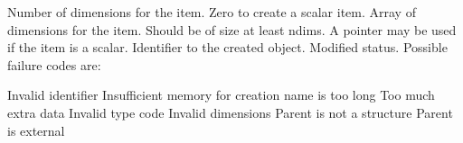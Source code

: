 \begin{manroutinedescription}
\begin{mantwocolumntable}
\end{mantwocolumntable}
\begin{manparametertable}
  Number of dimensions for the %
item. Zero
                            to create a scalar item.
 Array of dimensions for %
the item. Should be of
                            size at least ndims. A {} pointer may %
be used
                            if the item is a scalar.
 Identifier to the created %
object.
 Modified status. Possible %
failure codes are:
\end{manparametertable}
\begin{mantwocolumntable}
Invalid identifier
Insufficient memory for creation
name is too long
Too much extra data
Invalid type code
Invalid dimensions
Parent is not a structure
Parent is external
\end{mantwocolumntable}
\end{manroutinedescription}
